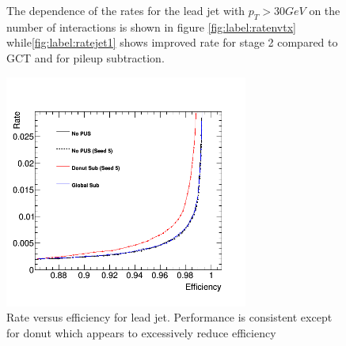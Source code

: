 \begin{figure}
\hfill
{}
\hfill
{}
\caption{The dependence of the rates for the lead jet with $p_T > 30 GeV$ on the number of interactions is shown in figure \ref{fig:label:ratenvtx} while\ref{fig:label:ratejet1} shows improved rate for stage 2 compared to GCT and for pileup subtraction.}
\label{fig:label:rates}
\end{figure}
\begin{figure}
\centering
    \includegraphics[width=8cm]{./Figures/jet1RateEff}
  \caption{Rate versus efficiency for lead jet. Performance is consistent except for donut which appears to excessively reduce efficiency}
  \label{fig:label:rateeff}
\end{figure}
